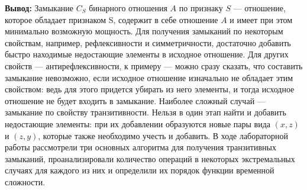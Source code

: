 \documentclass[12pt]{article}
\begin{document}
	{\bf Вывод:} Замыкание $C_S$ бинарного отношения $A$ по признаку $S$ --- отношение, которое обладает признаком S, содержит в себе отношение $A$ и имеет при этом минимально возможную мощность. Для получения замыканий по некоторым свойствам, например, рефлексивности и симметричности, достаточно добавить быстро находимые недостающие элементы в исходное отношение. Для других свойств --- антирефлексивности, к примеру --- можно сразу сказать, что составить замыкание невозможно, если исходное отношение изначально не обладает этим свойством: ведь для этого придется убирать из него элементы, и тогда исходное отношение не будет входить в замыкание. Наиболее сложный случай --- замыкание по свойству транзитивности. Нельзя в один этап найти и добавить недостающие элементы: при их добавлении образуются новые пары вида $(x, z)$ и $(z, y)$, которые также необходимо учесть и добавить. В ходе лабораторной работы рассмотрели три основных алгоритма для получения транзитивных замыканий, проанализировали количество операций в некоторых экстремальных случаях для каждого из них и определили их порядок функции временной сложности.
	 
\end{document}
